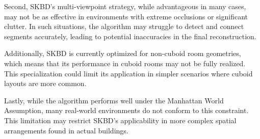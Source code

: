 Second, SKBD's multi-viewpoint strategy, while advantageous in many cases, may not be as effective in environments with extreme occlusions or significant clutter. In such situations, the algorithm may struggle to detect and connect segments accurately, leading to potential inaccuracies in the final reconstruction. 

Additionally, SKBD is currently optimized for non-cuboid room geometries, which means that its performance in cuboid rooms may not be fully realized. This specialization could limit its application in simpler scenarios where cuboid layouts are more common.

Lastly, while the algorithm performs well under the Manhattan World Assumption, many real-world environments do not conform to this constraint. This limitation may restrict SKBD's applicability in more complex spatial arrangements found in actual buildings.
